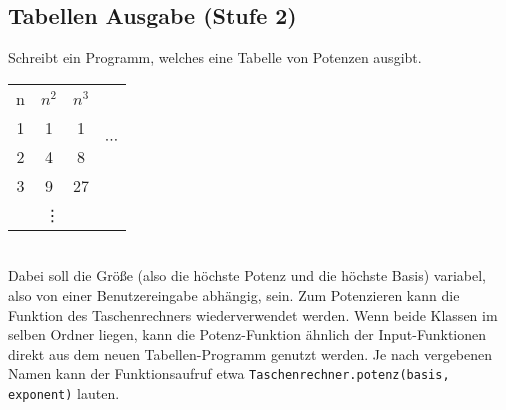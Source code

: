 \subsection{Tabellen Ausgabe (Stufe 2)}
Schreibt ein Programm, welches eine Tabelle von Potenzen ausgibt.
\\\begin{tabular}{|c|c|c|c}\cline{1-3}
n & $n^2$ & $n^3$ & \multirow{4}{*}{$\cdots$} \\\cline{1-3}
1 & 1 & 1 & \\\cline{1-3}
2 & 4 & 8 & \\\cline{1-3}
3 & 9 & 27 & \\\cline{1-3}
\multicolumn{3}{c}{\vdots}
\end{tabular}
\\Dabei soll die Größe (also die höchste Potenz und die höchste Basis) variabel,
also von einer Benutzereingabe abhängig, sein. Zum Potenzieren kann die Funktion
des Taschenrechners wiederverwendet werden. Wenn beide Klassen im selben Ordner
liegen, kann die Potenz-Funktion ähnlich der Input-Funktionen direkt aus dem
neuen Tabellen-Programm genutzt werden. Je nach vergebenen Namen kann der
Funktionsaufruf etwa \lstinline{Taschenrechner.potenz(basis, exponent)} lauten.
